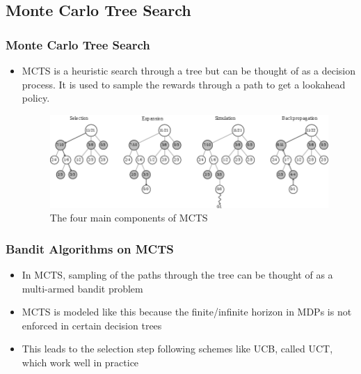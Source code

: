 \documentclass{beamer}
\begin{document}

\subsection{Monte Carlo Tree Search}


\begin{frame}
  \frametitle{Monte Carlo Tree Search}

  \begin{itemize}
    \item MCTS is a heuristic search through a tree but can be thought of as a decision process. It is used to sample the rewards through a path to get a lookahead policy.
    \begin{figure}
      \includegraphics[width=0.6\linewidth]{./images/mcts.png}
      \caption{The four main components of MCTS}
    \end{figure}
  \end{itemize}
\end{frame}



\begin{frame}
  \frametitle{Bandit Algorithms on MCTS}

  \begin{itemize}
    \item In MCTS, sampling of the paths through the tree can be thought of as a multi-armed bandit problem
    \item MCTS is modeled like this because the finite/infinite horizon in MDPs is not enforced in certain decision trees
    \item This leads to the selection step following schemes like UCB, called UCT, which work well in practice
  \end{itemize}
\end{frame}


\end{document}
